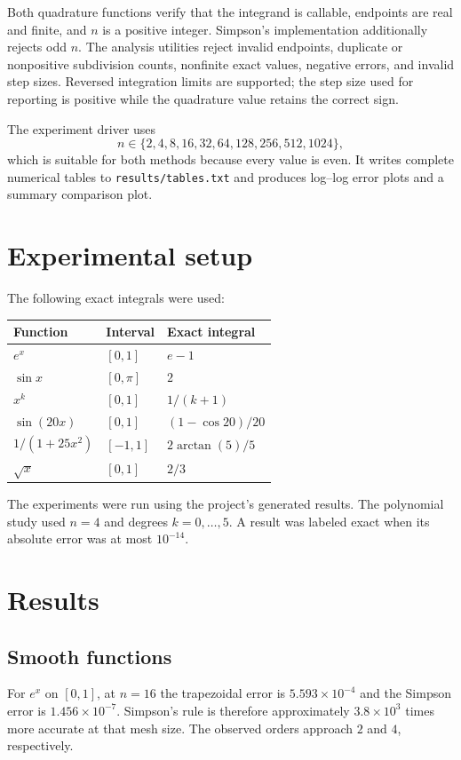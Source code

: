 \documentclass[11pt]{article}
\begin{document}
Both quadrature functions verify that the integrand is callable, endpoints are real and finite, and $n$ is a positive integer. Simpson's implementation additionally rejects odd $n$. The analysis utilities reject invalid endpoints, duplicate or nonpositive subdivision counts, nonfinite exact values, negative errors, and invalid step sizes. Reversed integration limits are supported; the step size used for reporting is positive while the quadrature value retains the correct sign.

The experiment driver uses
\[
 n\in\{2,4,8,16,32,64,128,256,512,1024\},
\]
which is suitable for both methods because every value is even. It writes complete numerical tables to \texttt{results/tables.txt} and produces log--log error plots and a summary comparison plot.

\section{Experimental setup}
The following exact integrals were used:
\begin{center}
\begin{tabular}{lll}
\toprule
Function & Interval & Exact integral\\
\midrule
$e^x$ & $[0,1]$ & $e-1$\\
$\sin x$ & $[0,\pi]$ & $2$\\
$x^k$ & $[0,1]$ & $1/(k+1)$\\
$\sin(20x)$ & $[0,1]$ & $(1-\cos 20)/20$\\
$1/(1+25x^2)$ & $[-1,1]$ & $2\arctan(5)/5$\\
$\sqrt{x}$ & $[0,1]$ & $2/3$\\
\bottomrule
\end{tabular}
\end{center}

The experiments were run using the project's generated results. The polynomial study used $n=4$ and degrees $k=0,\ldots,5$. A result was labeled exact when its absolute error was at most $10^{-14}$.

\section{Results}
\subsection{Smooth functions}
For $e^x$ on $[0,1]$, at $n=16$ the trapezoidal error is $5.593\times10^{-4}$ and the Simpson error is $1.456\times10^{-7}$. Simpson's rule is therefore approximately $3.8\times10^3$ times more accurate at that mesh size. The observed orders approach $2$ and $4$, respectively.
\end{document}
